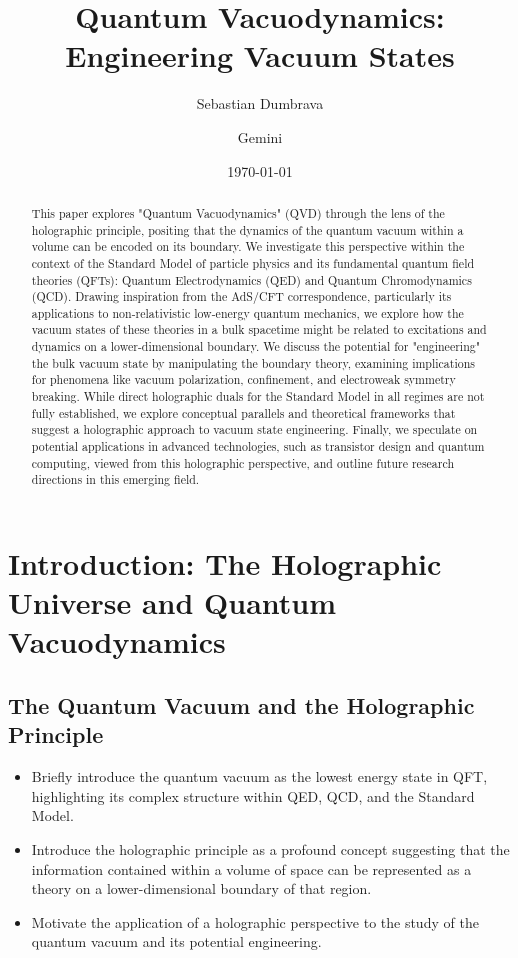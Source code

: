 \documentclass{amsart}
\title{Quantum Vacuodynamics: Engineering Vacuum States}
\author{Sebastian Dumbrava}
\author{Gemini}
\date{\today}
\begin{document}
\maketitle
\tableofcontents

\begin{abstract}
This paper explores "Quantum Vacuodynamics" (QVD) through the lens of the holographic principle, positing that the dynamics of the quantum vacuum within a volume can be encoded on its boundary. We investigate this perspective within the context of the Standard Model of particle physics and its fundamental quantum field theories (QFTs): Quantum Electrodynamics (QED) and Quantum Chromodynamics (QCD). Drawing inspiration from the AdS/CFT correspondence, particularly its applications to non-relativistic low-energy quantum mechanics, we explore how the vacuum states of these theories in a bulk spacetime might be related to excitations and dynamics on a lower-dimensional boundary. We discuss the potential for "engineering" the bulk vacuum state by manipulating the boundary theory, examining implications for phenomena like vacuum polarization, confinement, and electroweak symmetry breaking. While direct holographic duals for the Standard Model in all regimes are not fully established, we explore conceptual parallels and theoretical frameworks that suggest a holographic approach to vacuum state engineering. Finally, we speculate on potential applications in advanced technologies, such as transistor design and quantum computing, viewed from this holographic perspective, and outline future research directions in this emerging field.
\end{abstract}

\section{Introduction: The Holographic Universe and Quantum Vacuodynamics}

\subsection{The Quantum Vacuum and the Holographic Principle}
\begin{itemize}
    \item Briefly introduce the quantum vacuum as the lowest energy state in QFT, highlighting its complex structure within QED, QCD, and the Standard Model.
    \item Introduce the holographic principle as a profound concept suggesting that the information contained within a volume of space can be represented as a theory on a lower-dimensional boundary of that region.
    \item Motivate the application of a holographic perspective to the study of the quantum vacuum and its potential engineering.
\end{itemize}
\end{document}
